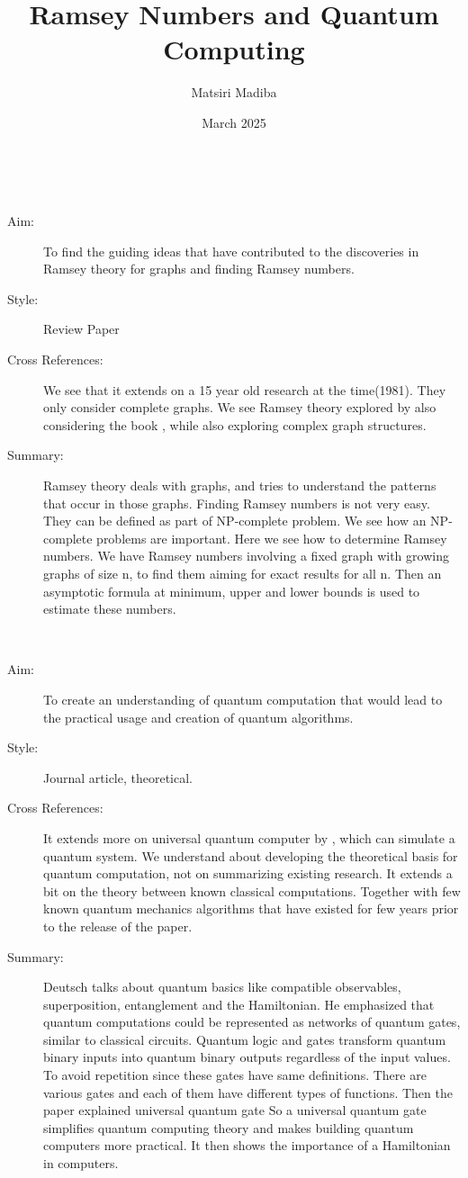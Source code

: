 \documentclass{Assignment}
\author{Matsiri Madiba}
\date{March 2025}
\title{Ramsey Numbers and Quantum Computing}
\begin{document}
\maketitle
\cite{burr1981generalized}~
\begin{description}
	\item[Aim:]
To find the guiding ideas that have contributed to the discoveries in Ramsey theory for graphs and finding Ramsey numbers.
\item[Style:]
Review Paper
\item[Cross References:]
We see that it extends on a 15 year old research at the time(1981). They only consider complete graphs. We see Ramsey theory explored by also considering the book \cite{graham1980ramsey}, while also exploring complex graph structures.
\item [Summary:]
Ramsey theory deals with graphs, and tries to understand the patterns that occur in those graphs.
Finding Ramsey numbers is not very easy.
They can be defined as part of NP-complete problem.
We see how an NP-complete problems are important.
Here we see how to determine Ramsey numbers.  
We have Ramsey numbers involving a fixed graph with growing graphs of size n, to find them aiming for exact results for all n. 
Then an asymptotic formula at minimum, upper and lower bounds is used to estimate these numbers.  

\end{description}
\newpage
\cite{f3197c3a-bce3-3c72-b6d6-c1ee34ac9328}~
	    \begin{description}
			\item [ Aim:]
		To create an understanding of quantum computation that would lead to the practical usage and creation of quantum algorithms.
		\item[Style:]
		Journal article, theoretical.
		\item[Cross References:]
		It extends more on universal quantum computer by \cite{deutsch1985quantum}, which can simulate a quantum system. 
		We understand about developing the theoretical basis for quantum computation, not on summarizing existing research. 
		It extends a bit on the theory between known classical computations. 
		Together with few known quantum mechanics algorithms that have existed for few years prior to the release of the paper.
		\item [Summary:]
		Deutsch talks about quantum basics like compatible observables, superposition, entanglement and the Hamiltonian.
		He emphasized that quantum computations could be represented as networks of quantum gates, similar to classical circuits.
		Quantum logic and gates transform quantum binary inputs into quantum binary outputs regardless of the input values. To avoid repetition since these gates have same definitions.
		There are various gates and each of them have different types of functions.
		Then the paper explained universal quantum gate
		So a universal quantum gate simplifies quantum computing theory and makes building quantum computers more practical. It then shows the importance of a Hamiltonian in computers.
	\end{description}

	
	 	\newpage
	 	
\end{document}
